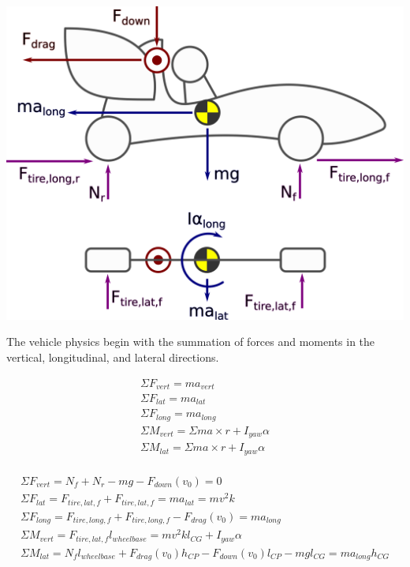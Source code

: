 \documentclass{article}
\begin{document}
\begin{center}
\includegraphics[width=\textwidth]{twotire_fbd.png}
\end{center}

The vehicle physics begin with the summation of forces and moments in the vertical, longitudinal, and lateral directions.

\begin{align}
	\Sigma F_{vert} = m a_{vert} \\
	\Sigma F_{lat} = m a_{lat} \\
	\Sigma F_{long} = m a_{long} \\
	\Sigma M_{vert} = \Sigma m a \times r + I_{yaw} \alpha \\
	\Sigma M_{lat} = \Sigma m a \times r + I_{yaw} \alpha \\
\end{align}

\begin{align}	
	\Sigma F_{vert} = N_{f} + N_{r} - m g - F_{down}(v_0) = 0 \\
	\Sigma F_{lat}  = F_{tire,lat,f} + F_{tire,lat,f} = m a_{lat} = m v^2 k \\
	\Sigma F_{long} = F_{tire,long,f} + F_{tire,long,f} - F_{drag}(v_0) = m a_{long} \\	
	\Sigma M_{vert} = F_{tire,lat,f} l_{wheelbase} = m v^2 k l_{CG} + I_{yaw} \alpha \\
	\Sigma M_{lat}  = N_{f} l_{wheelbase} + F_{drag}(v_0) h_{CP} - F_{down}(v_0) l_{CP} - m g l_{CG} = m a_{long} h_{CG}
\end{align}
\end{document}
